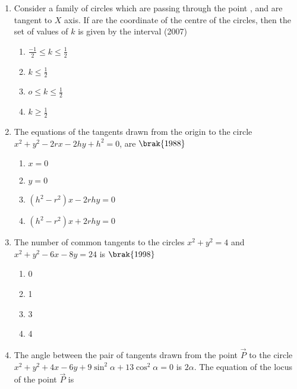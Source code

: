 \begin{enumerate}
\item Consider a family of circles which are passing through the point ,  and are tangent to $X$ axis. If  are the coordinate of the centre of the circles,  then the set of values of $k$ is given by the interval
\hfill{(2007)}
\begin{multicols}{4}
\begin{multicols}{2}
\begin{enumerate}
\item $\frac{-1}{2} \le k \le \frac{1}{2}$
\item $k \le \frac{1}{2}$
\item $o \le k \le \frac{1}{2}$
\item $k \ge \frac{1}{2}$
\end{enumerate}
\end{multicols}
\end{multicols}
\item The equations of the tangents drawn from the origin to the circle $x^2+y^2-2rx-2hy+h^2=0$, are
    \hfill$\brak{1988}$
\begin{multicols}{2}
\begin{multicols}{2}
\begin{enumerate}
    \item $x=0$
    \item $y=0$
    \item $(h^2-r^2)x-2rhy=0$
    \item $(h^2-r^2)x+2rhy=0$
\end{enumerate}
\end{multicols}
\end{multicols}
\item The number of common tangents to the circles $x^2+y^2=4$ and $x^2+y^2-6x-8y=24$ is 
    \hfill$\brak{1998}$
\begin{multicols}{4}
\begin{multicols}{2}
\begin{enumerate}
    \item 0
    \item 1 
    \item 3
    \item 4
\end{enumerate}
\end{multicols}
\end{multicols}
    \item The angle between the pair of tangents drawn from the point $\vec{P}$ to the circle $x^{2}+y^{2}+4x-6y+9\sin^{2}{\alpha}+13\cos^{2}{\alpha}=0$ is $2\alpha$. The equation of the locus of the point $\vec{P}$ is

\end{enumerate}
